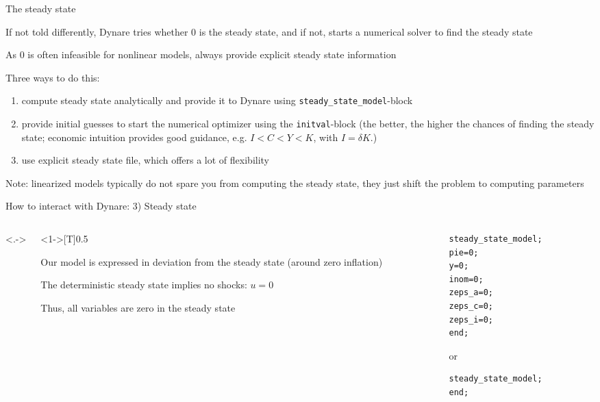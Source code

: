 \documentclass[handout,usepdftitle=false,xcolor=dvipsnames,aspectratio=169]{beamer}
\begin{document}
\begin{frame}{The steady state}
\begin{witemize}
	\item If not told differently, Dynare tries whether 0 is the steady state, and if not, starts a numerical solver to find the steady state
	\item As 0 is often infeasible for nonlinear models, always provide explicit steady state information
	\item Three ways to do this:
	\begin{enumerate}
		\item compute steady state analytically and provide it to Dynare using \texttt{steady\_state\_model}-block
		\item provide initial guesses to start the numerical optimizer using the \texttt{initval}-block (the better, the higher the chances of finding the steady state; economic intuition provides good guidance, e.g. $I<C<Y<K$, with $I=\delta K$.)
		\item use explicit steady state file, which offers a lot of flexibility
	\end{enumerate}
	\item Note: linearized models typically do not spare you from computing the steady state, they just shift the problem to computing parameters
\end{witemize}
\end{frame}


\begin{frame}[fragile]{How to interact with Dynare: 3) Steady state}
\begin{columns}<.->
\begin{column}<1->[T]{0.5\textwidth}
	    \begin{witemize}
	        \item Our model is expressed in deviation from the steady state (around zero inflation)
	        \item The deterministic steady state implies no shocks: $u= 0$
	        \item Thus, all variables are zero in the steady state
	    \end{witemize}
\end{column}
\begin{column}[T]{0.5\textwidth}
\begin{verbatim}
steady_state_model;
pie=0;
y=0;
inom=0;
zeps_a=0;
zeps_c=0;
zeps_i=0;
end;
\end{verbatim}
or
\begin{verbatim}
steady_state_model;
end;
\end{verbatim}
\end{column}
\end{columns}
\end{frame}
\end{document}
